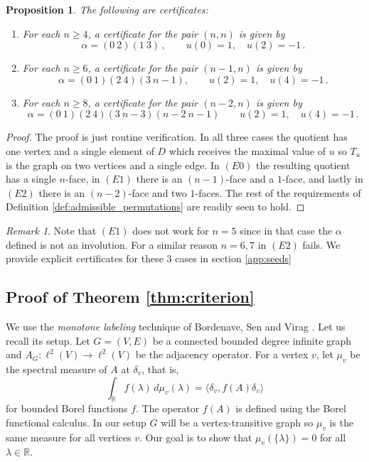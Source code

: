 \documentclass[11pt]{article}
\newtheorem{proposition}[theorem]{Proposition}
\theoremstyle{remark}
\newtheorem{remark}[theorem]{Remark}
\newcommand{\R}{\mathbb R}
\newcommand{\elltwo}{\ell^2}
\begin{document}
\begin{proposition}\label{prop:easypairs} The following are  certificates:
\begin{enumerate}
\item[(E0)] For each $n\geq 4$, a certificate for the pair $(n,n)$ is given by
    $$ \alpha = (0\ 2) (1\ 3) \, , \qquad u(0)=1, \quad u(2)=-1 \, .$$ 

\item[(E1)] For each $n\geq 6$, a certificate for the pair $(n-1,n)$ is given by 
$$ \alpha = (0\ 1) (2\ 4) (3\ n-1), \qquad u(2)=1, \quad u(4)=-1 \, .$$

\item[(E2)] For each $n\geq 8$, a certificate for the pair $(n-2,n)$ is given by
$$\alpha=(0\ 1)(2\ 4)(3\ n-3)(n-2\ n-1)\qquad u(2)=1,\quad u(4)=-1\,.$$
\end{enumerate}
\end{proposition}
\begin{proof}
The proof is just routine verification. In all three cases the quotient has one vertex and a single element of $D$ which receives the maximal value of $u$ so $T_u$ is the graph on two vertices and a single edge. In $(E0)$ the resulting quotient has a single $n$-face, in $(E1)$ there is an $(n-1)$-face and a $1$-face, and lastly in $(E2)$ there is an $(n-2)$-face and two $1$-faces. The rest of the requirements of Definition \ref{def:admissible_permutations} are readily seen to hold.     
\end{proof}

\begin{remark} Note that $(E1)$ does not work for $n=5$ since in that case the $\alpha$ defined is not an involution. For a similar reason $n=6,7$ in $(E2)$ fails. We provide explicit certificates for these $3$ cases in section \ref{app:seeds}
\end{remark}


\subsection{Proof of Theorem \ref{thm:criterion}} \label{sec:criterionProof}

We use the \emph{monotone labeling} technique of Bordenave, Sen and Virag \cite[Theorem 2.3]{BSV17}. Let us recall its setup. Let $G=(V,E)$ be a connected bounded degree infinite graph and $A_G:\elltwo(V)\to\elltwo(V)$ be the adjacency operator. For a vertex $v$, let $\mu_v$ be the spectral measure of $A$ at $\delta_v$, that is,
\[
\int_{\R} f(\lambda)\,d\mu_v(\lambda)
 =\langle \delta_v,f(A)\delta_v\rangle
\]
for bounded Borel functions $f$. The operator $f(A)$ is defined using the Borel functional calculus. In our setup $G$ will be a vertex-transitive graph so $\mu_v$ is the same measure for all vertices $v$. Our goal is to show that $\mu_v(\{\lambda\})=0$ for all $\lambda \in \R$.
\end{document}
